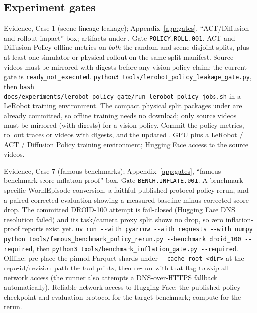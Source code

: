 \subsection*{Experiment gates}

{Evidence, Case 1 (scene-lineage leakage); Appendix~\ref{app:gates}, ``ACT/Diffusion and rollout
impact'' box; artifacts under . Gate \texttt{POLICY.ROLL.001}.}
{ACT and Diffusion Policy offline metrics on \emph{both} the random and scene-disjoint splits, plus at
least one simulator or physical rollout on the same split manifest. Source videos must be mirrored
with digests before any vision-policy claim; the current gate is \texttt{ready\_not\_executed}.}
{\texttt{python3 tools/lerobot\_policy\_leakage\_gate.py}, then
\texttt{bash docs/experiments/lerobot\_policy\_gate/run\_lerobot\_policy\_jobs.sh} in a LeRobot
training environment. The compact physical split packages under
 are already committed, so offline
training needs no download; only source videos must be mirrored (with digests) for a vision policy.
Commit the policy metrics, rollout traces or videos with digests, and the updated
.}
{GPU plus a LeRobot / ACT / Diffusion Policy training environment; Hugging Face access to the source
videos.}

{Evidence, Case 7 (famous benchmarks); Appendix~\ref{app:gates}, ``famous-benchmark
score-inflation proof'' box. Gate \texttt{BENCH.INFLATE.001}.}
{A benchmark-specific WorldEpisode conversion, a faithful published-protocol policy rerun, and a
paired corrected evaluation showing a measured baseline-minus-corrected score drop. The committed
DROID-100 attempt is fail-closed (Hugging Face DNS resolution failed) and its task/camera proxy split
shows no drop, so zero inflation-proof reports exist yet.}
{\texttt{uv run -{}-with pyarrow -{}-with requests -{}-with numpy python
tools/famous\_benchmark\_policy\_rerun.py -{}-benchmark droid\_100 -{}-required}, then
\texttt{python3 tools/benchmark\_inflation\_gate.py -{}-required}. Offline: pre-place the pinned
Parquet shards under \texttt{-{}-cache-root <dir>} at the repo-id/revision path the tool prints, then
re-run with that flag to skip all network access (the runner also attempts a DNS-over-HTTPS fallback
automatically).}
{Reliable network access to Hugging Face; the published policy checkpoint and evaluation protocol for
the target benchmark; compute for the rerun.}


